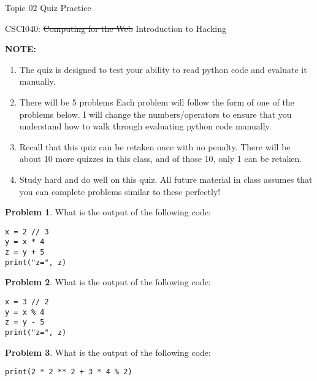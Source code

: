 \documentclass[10pt]{article}
\theoremstyle{definition}
\newtheorem{problem}{Problem}
\begin{document}
\begin{center}
    {
\Large
    Topic 02 Quiz Practice
}

    \vspace{0.1in}
    CSCI040: \sout{Computing for the Web} Introduction to Hacking

    \vspace{0.1in}
\end{center}

\noindent
\textbf{NOTE:}
\begin{enumerate}
\item
The quiz is designed to test your ability to read python code and evaluate it manually.
\item
There will be 5 problems
Each problem will follow the form of one of the problems below.
I will change the numbers/operators to ensure that you understand how to walk through evaluating python code manually.
\item
Recall that this quiz can be retaken once with no penalty.
There will be about 10 more quizzes in this class,
and of those 10, only 1 can be retaken.
\item
Study hard and do well on this quiz.
All future material in class assumes that you can complete problems similar to these perfectly!
\end{enumerate}
\vspace{0.15in}

\begin{problem}
    What is the output of the following code:
\end{problem}
\begin{lstlisting}
x = 2 // 3
y = x * 4
z = y + 5
print("z=", z)
\end{lstlisting}
\vspace{1.5in}

\begin{problem}
    What is the output of the following code:
\end{problem}
\begin{lstlisting}
x = 3 // 2
y = x % 4
z = y - 5
print("z=", z)
\end{lstlisting}
\vspace{1.5in}

\begin{problem}
    What is the output of the following code:
\end{problem}
\begin{lstlisting}
print(2 * 2 ** 2 + 3 * 4 % 2)
\end{lstlisting}
\vspace{1.5in}
\end{document}
